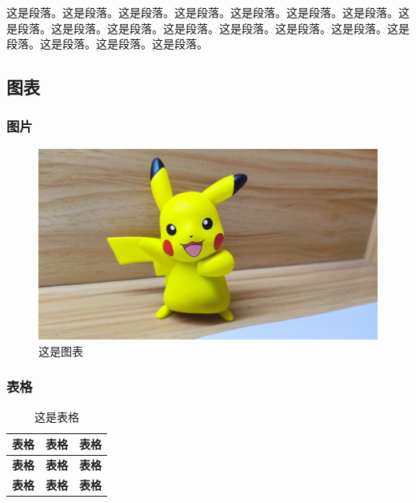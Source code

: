 \begin{ujnbody}
    这是段落。这是段落。这是段落。这是段落。这是段落。这是段落。这是段落。这是段落。这是段落。这是段落。这是段落。这是段落。这是段落。这是段落。这是段落。这是段落。这是段落。这是段落。
    \subsection{图表}

    \subsubsection{图片}

    \begin{figure}[htbp]
        \centering
        \includegraphics[scale=0.1, ]{figures/pikachu.jpg}
        \caption{这是图表}
    \end{figure}

    \subsubsection{表格}

    \begin{table}[htbp]
        \centering
        \caption{这是表格}
        \begin{tabular}{|c|c|c|}
            \hline
            \multicolumn{1}{|c|}{\textbf{表格}} & \multicolumn{1}{c|}{\textbf{表格}} & \multicolumn{1}{c|}{\textbf{表格}} \\ \hline
            \multicolumn{1}{|c|}{\textbf{表格}} & \multicolumn{1}{c|}{\textbf{表格}} & \multicolumn{1}{c|}{\textbf{表格}} \\ \hline
            \multicolumn{1}{|c|}{\textbf{表格}} & \multicolumn{1}{c|}{\textbf{表格}} & \multicolumn{1}{c|}{\textbf{表格}} \\ \hline
        \end{tabular}
    \end{table}

\end{ujnbody}

